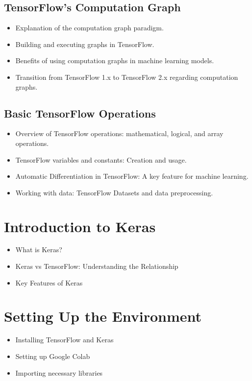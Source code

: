 \documentclass[a4paper,12pt]{book}
\begin{document}
\subsection{TensorFlow's Computation Graph}
\begin{itemize}
    \item Explanation of the computation graph paradigm.
    \item Building and executing graphs in TensorFlow.
    \item Benefits of using computation graphs in machine learning models.
    \item Transition from TensorFlow 1.x to TensorFlow 2.x regarding computation graphs.
\end{itemize}

\subsection{Basic TensorFlow Operations}
\begin{itemize}
    \item Overview of TensorFlow operations: mathematical, logical, and array operations.
    \item TensorFlow variables and constants: Creation and usage.
    \item Automatic Differentiation in TensorFlow: A key feature for machine learning.
    \item Working with data: TensorFlow Datasets and data preprocessing.
\end{itemize}

\section{Introduction to Keras}
\begin{itemize}
    \item What is Keras?
    \item Keras vs TensorFlow: Understanding the Relationship
    \item Key Features of Keras
\end{itemize}

\section{Setting Up the Environment}
\begin{itemize}
    \item Installing TensorFlow and Keras
    \item Setting up Google Colab
    \item Importing necessary libraries
\end{itemize}
\end{document}
